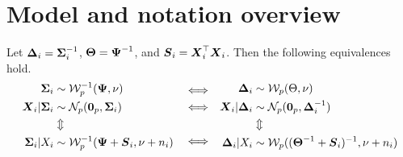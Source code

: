 \documentclass{article}\usepackage[]{graphicx}\usepackage[]{color}
\begin{document}
\section{Model and notation overview}
Let ${\boldsymbol{\Delta}}_i = {\boldsymbol{\Sigma}}_i^{-1}$, ${\boldsymbol{\Theta}} = {\boldsymbol{\Psi}}^{-1}$, and ${\boldsymbol{S}}_i = {\boldsymbol{X}}_i^\top {\boldsymbol{X}}_i$. Then the following equivalences hold.
\begin{equation*}
\begin{aligned}
  {\boldsymbol{\Sigma}}_i &\sim \mathcal{W}^{-1}_p({\boldsymbol{\Psi}}, \nu) \\
  {\boldsymbol{X}}_i | {\boldsymbol{\Sigma}}_i &\sim \mathcal{N}_p(\boldsymbol{0}_p, {\boldsymbol{\Sigma}}_i) \\
  &\Updownarrow \\
  {\boldsymbol{\Sigma}}_i | X_i  &\sim \mathcal{W}^{-1}_p({\boldsymbol{\Psi}} + {\boldsymbol{S}}_i, \nu + n_i)
\end{aligned}
\begin{aligned}
\quad
&\Longleftrightarrow \\
&\Longleftrightarrow \\
\\
&\Longleftrightarrow
\quad
\end{aligned}
\begin{aligned}
  {\boldsymbol{\Delta}}_i &\sim \mathcal{W}_p(\Theta, \nu) \\
  {\boldsymbol{X}}_i | {\boldsymbol{\Delta}}_i &\sim \mathcal{N}_p(\boldsymbol{0}_p, {\boldsymbol{\Delta}}_i^{-1}) \\
  &\Updownarrow \\
  {\boldsymbol{\Delta}}_i | X_i  &\sim \mathcal{W}_p(({\boldsymbol{\Theta}}^{-1} + {\boldsymbol{S}}_i)^{-1}, \nu + n_i)
\end{aligned}
\end{equation*}
\end{document}
